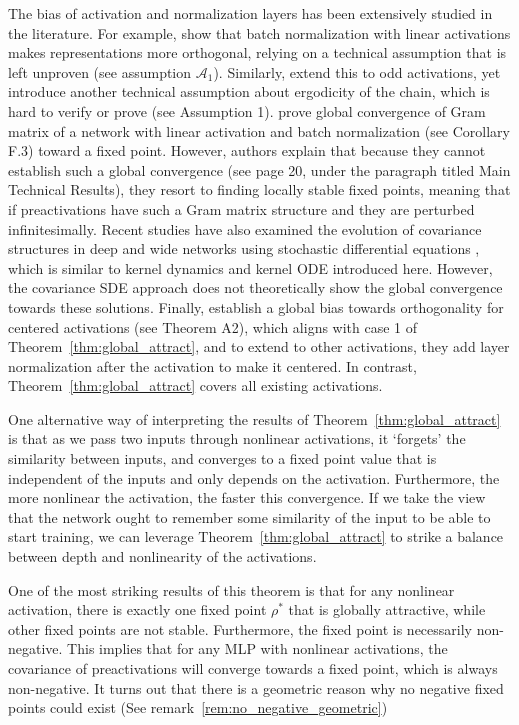 \documentclass[twoside]{article}
\theoremstyle{definition}
\begin{document}
The bias of activation and normalization layers has been extensively studied in the literature. For example, \citet{daneshmand2021batch} show that batch normalization with linear activations makes representations more orthogonal, relying on a technical assumption that is left unproven (see assumption $\mathcal{A}_1$). Similarly, \citet{joudaki2023bridging} extend this to odd activations, yet introduce another technical assumption about ergodicity of the chain, which is hard to verify or prove (see Assumption 1). \citet{yang2019meanfield} prove global convergence of Gram matrix of a network with linear activation and batch normalization (see Corollary F.3) toward a fixed point. However,  authors explain that because they cannot establish such a global convergence (see page 20, under the paragraph titled Main Technical Results), they resort to finding locally stable fixed points, meaning that if preactivations have such a Gram matrix structure and they are perturbed infinitesimally.  Recent studies have also examined the evolution of covariance structures in deep and wide networks using stochastic differential equations \citep{li2022neural}, which is similar to kernel dynamics and kernel ODE introduced here. However, the covariance SDE approach does not theoretically show the global convergence towards these solutions. Finally, \citet{joudaki2023impact} establish a global bias towards orthogonality for centered activations (see Theorem A2), which aligns with case 1 of Theorem~\ref{thm:global_attract}, and to extend to other activations, they add layer normalization after the activation to make it centered. In contrast, Theorem~\ref{thm:global_attract} covers all existing activations. 

One alternative way of interpreting the results of Theorem~\ref{thm:global_attract} is that as we pass two inputs through nonlinear activations, it `forgets' the similarity between inputs, and converges to a fixed point value that is independent of the inputs and only depends on the activation. Furthermore, the more nonlinear the activation, the faster this convergence. If we take the view that the network ought to remember some similarity of the input to be able to start training, we can leverage Theorem~\ref{thm:global_attract} to strike a balance between depth and nonlinearity of the activations. 


One of the most striking results of this theorem is that for any nonlinear activation, there is exactly one fixed point $\rho^*$ that is globally attractive, while other fixed points are not stable. Furthermore, the fixed point is necessarily non-negative. This implies that for any MLP with nonlinear activations, the covariance of preactivations will converge towards a fixed point, which is always non-negative. It turns out that there is a geometric reason why no negative fixed points could exist (See remark~\ref{rem:no_negative_geometric})
\end{document}
